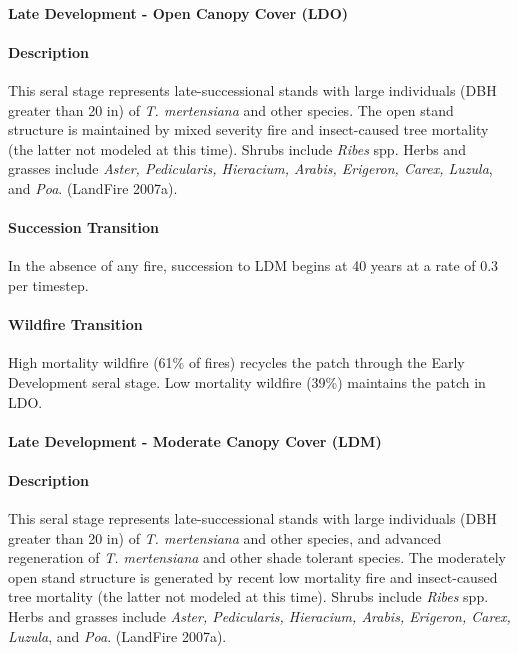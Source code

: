 \noindent\hrulefill


\paragraph{Late Development - Open Canopy Cover (LDO)}

\paragraph{Description} This seral stage represents late-successional stands with large individuals (DBH greater than 20 in) of \emph{T. mertensiana} and other species. The open stand structure is maintained by mixed severity fire and insect-caused tree mortality (the latter not modeled at this time). Shrubs include \emph{Ribes} spp. Herbs and grasses include \emph{Aster, Pedicularis, Hieracium, Arabis, Erigeron, Carex, Luzula}, and \emph{Poa}. (LandFire 2007a).

\paragraph{Succession Transition} In the absence of any fire, succession to LDM begins at 40 years at a rate of 0.3 per timestep.

\paragraph{Wildfire Transition} High mortality wildfire (61\% of fires) recycles the patch through the Early Development seral stage. Low mortality wildfire (39\%) maintains the patch in LDO.

\noindent\hrulefill

\paragraph{Late Development - Moderate Canopy Cover (LDM)}

\paragraph{Description} This seral stage represents late-successional stands with large individuals (DBH greater than 20 in) of \emph{T. mertensiana} and other species, and advanced regeneration of \emph{T. mertensiana} and other shade tolerant species. The moderately open stand structure is generated by recent low mortality fire and insect-caused tree mortality (the latter not modeled at this time). Shrubs include \emph{Ribes} spp. Herbs and grasses include \emph{Aster, Pedicularis, Hieracium, Arabis, Erigeron, Carex, Luzula}, and \emph{Poa}. (LandFire 2007a).

